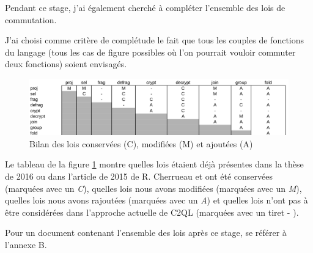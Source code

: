 Pendant ce stage, j'ai également cherché à compléter l'ensemble des lois de commutation.

J'ai choisi comme critère de complétude le fait que tous les couples de fonctions
du langage (tous les cas de figure possibles où l'on pourrait vouloir commuter
deux fonctions) soient envisagés.

\begin{figure}
\includegraphics[width=\textwidth]{complLoisBilan.png}
\caption{Bilan des lois conservées (C), modifiées (M) et ajoutées (A)}
\label{complLois}
\end{figure}

Le tableau de la figure \ref{complLois}  montre quelles lois étaient déjà
présentes dans la thèse de 2016 ou dans l'article de 2015 de R. Cherrueau
et ont été conservées (marquées avec un \emph{C}),
quelles lois nous avons modifiées (marquées avec un \emph{M}),
quelles lois nous avons rajoutées (marquées avec un \emph{A})
et quelles lois n'ont pas à être considérées dans l'approche actuelle
de C2QL (marquées avec un tiret \og - \fg{}).

Pour un document contenant l'ensemble des lois après ce stage,
se référer à l'annexe B.
